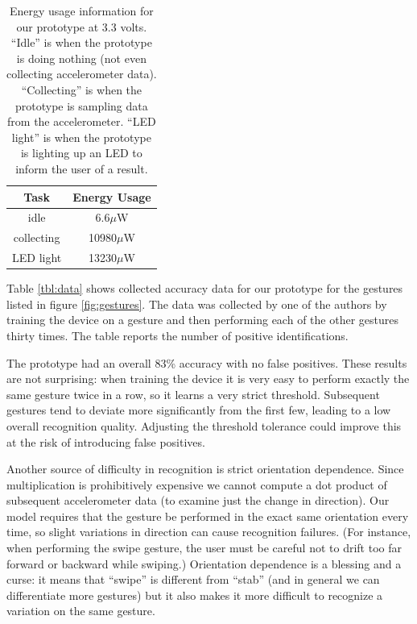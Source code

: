\documentclass[12pt]{article}
\begin{document}
\begin{table}
\begin{center}
    \begin{tabular}{c|c}
    Task & Energy Usage \\
    \hline
    idle & 6.6$\mu$W \\
    collecting & 10980$\mu$W \\
    LED light & 13230$\mu$W \\
    \end{tabular}
    \caption{Energy usage information for our prototype at 3.3 volts. ``Idle''
    is when the prototype is doing nothing (not even collecting accelerometer
    data). ``Collecting'' is when the prototype is sampling data from the
    accelerometer. ``LED light'' is when the prototype is lighting up an LED to
    inform the user of a result.}
    \label{tbl:power}
\end{center}
\end{table}

Table \ref{tbl:data} shows collected accuracy data for our prototype for the
gestures listed in figure \ref{fig:gestures}. The data was collected by one of
the authors by training the device on a gesture and then performing each of
the other gestures thirty times. The table reports the number of positive
identifications.

The prototype had an overall 83\% accuracy with no false positives. These
results are not surprising: when training the device it is very easy to perform
exactly the same gesture twice in a row, so it learns a very strict threshold.
Subsequent gestures tend to deviate more significantly from the first few,
leading to a low overall recognition quality. Adjusting the threshold tolerance
could improve this at the risk of introducing false positives.

Another source of difficulty in recognition is strict orientation dependence.
Since multiplication is prohibitively expensive we cannot compute a dot product
of subsequent accelerometer data (to examine just the change in direction). Our
model requires that the gesture be performed in the exact same orientation
every time, so slight variations in direction can cause recognition failures.
(For instance, when performing the swipe gesture, the user must be careful not
to drift too far forward or backward while swiping.) Orientation dependence is
a blessing and a curse: it means that ``swipe'' is different from ``stab'' (and
in general we can differentiate more gestures) but it also makes it more
difficult to recognize a variation on the same gesture.
\end{document}
